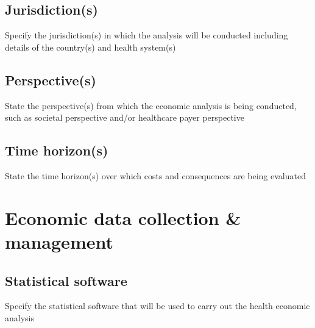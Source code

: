 \subsection{Jurisdiction(s)}

Specify the jurisdiction(s) in which the analysis will be conducted
including details of the country(s) and health system(s)



\subsection{Perspective(s)}

State the perspective(s) from which the economic analysis is being
conducted, such as societal perspective and/or healthcare payer
perspective



\subsection{Time horizon(s)}

State the time horizon(s) over which costs and consequences are being evaluated



\section{Economic data collection \& management}

\subsection{Statistical software}

Specify the statistical software that will be used to carry out the
health economic analysis



